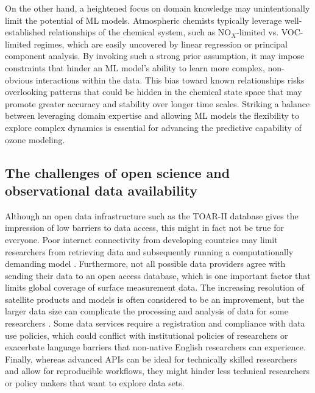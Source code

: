 \documentclass[gmd, manuscript]{copernicus}
\begin{document}
On the other hand, a heightened focus on domain knowledge may unintentionally limit the potential of ML models. Atmospheric chemists typically leverage well-established relationships of the chemical system, such as NO$_X$-limited vs. VOC-limited regimes, which are easily uncovered by linear regression or principal component analysis. By invoking such a strong prior assumption, it may impose constraints that hinder an ML model's ability to learn more complex, non-obvious interactions within the data. This bias toward known relationships risks overlooking patterns that could be hidden in the chemical state space that may promote greater accuracy and stability over longer time scales. Striking a balance between leveraging domain expertise and allowing ML models the flexibility to explore complex dynamics is essential for advancing the predictive capability of ozone modeling.

\subsection{The challenges of open science and observational data availability}

Although an open data infrastructure such as the TOAR-II database gives the impression of low barriers to data access, this might in fact not be true for everyone. Poor internet connectivity from developing countries may limit researchers from retrieving data and subsequently running a computationally demanding model \citep{Blanken2022, Dwivedi2022}. Furthermore, not all possible data providers agree with sending their data to an open access database, which is one important factor that limits global coverage of surface measurement data. The increasing resolution of satellite products and models is often considered to be an improvement, but the larger data size can complicate the processing and analysis of data for some researchers \citep{jain_use_2022}. Some data services require a registration and compliance with data use policies, which could conflict with institutional policies of researchers or exacerbate language barriers that non-native English researchers can experience. Finally, whereas advanced APIs can be ideal for technically skilled researchers and allow for reproducible workflows, they might hinder less technical researchers or policy makers that want to explore data sets.
\end{document}
